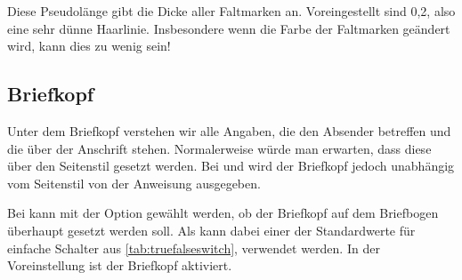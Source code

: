 \begin{Declaration}
\end{Declaration}
Diese Pseudolänge gibt die Dicke aller
Faltmarken an. Voreingestellt sind 0,2, also
eine sehr dünne Haarlinie. Insbesondere wenn die Farbe der Faltmarken
geändert wird, kann dies zu wenig sein!%
\EndIndexGroup
%
\EndIndexGroup


\subsection{Briefkopf}
\BeginIndexGroup
{}%

Unter dem Briefkopf verstehen wir alle Angaben, die den Absender betreffen und
die über der Anschrift stehen. Normalerweise würde man erwarten, dass diese
über den Seitenstil gesetzt werden. %
\iffalse%
Bei der alten Briefklasse \Class{scrlettr} war dies auch so. %
\fi%
Bei  und  wird der
Briefkopf jedoch unabhängig vom Seitenstil von der Anweisung
 ausgegeben.
\iffalse%
Dabei wird der Briefkopf absolut positioniert, ist also vom Satzspiegel
unabhängig.  Die erste Seite eines Briefes, also die Seite mit dem Briefkopf,
wird tatsächlich mit dem Seitenstil
\DescRef{\LabelBase.pagestyle.empty}\IndexPagestyle{empty} gesetzt.%
\fi

\begin{Declaration}
\end{Declaration}
\iffalse%
Das\ChangedAt{v2.97e}{\Class{scrlttr2}} oberste Element eines Briefbogens ist
normalerweise der Briefkopf. Bei
\else%
Bei
\fi%
\KOMAScript{} kann mit der Option
 gewählt werden, ob der Briefkopf auf dem Briefbogen
überhaupt gesetzt werden soll. Als  kann dabei einer der
Standardwerte für einfache Schalter aus \autoref{tab:truefalseswitch},
 verwendet werden. In der Voreinstellung ist
der Briefkopf aktiviert.%
%
\EndIndexGroup


